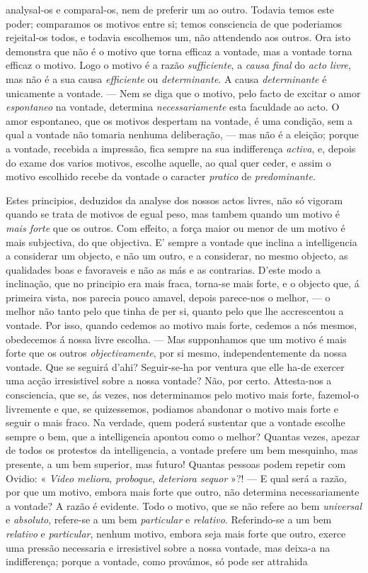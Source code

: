 analysal-os e comparal-os, nem de preferir um ao outro. Todavia temos este poder; comparamos os motivos entre si; temos consciencia de que poderiamos rejeital-os todos, e todavia escolhemos um, não attendendo aos outros. Ora isto demonstra que não é o motivo que torna efficaz a vontade, mas a vontade torna efficaz o motivo. Logo o motivo é a razão \emph{sufficiente}, a \emph{causa final} do \emph{acto livre}, mas não é a sua causa \emph{efficiente} ou \emph{determinante}. A causa \emph{determinante} é unicamente a vontade. --- Nem se diga que o motivo, pelo facto de excitar o amor \emph{espontaneo} na vontade, determina \emph{necessariamente} esta faculdade ao acto. O amor espontaneo, que os motivos despertam na vontade, é uma condição, sem a qual a vontade não tomaria nenhuma deliberação, --- mas não é a eleição; porque a vontade, recebida a impressão, fica sempre na sua indifferença \emph{activa}, e, depois do exame dos varios motivos, escolhe aquelle, ao qual quer ceder, e assim o motivo escolhido recebe da vontade o caracter \emph{pratico} de \emph{predominante}.\par Estes principios, deduzidos da analyse dos nossos actos livres, não só vigoram quando se trata de motivos de egual peso, mas tambem quando um motivo é \emph{mais forte} que os outros. Com effeito, a força maior ou menor de um motivo é mais subjectiva, do que objectiva. E' sempre a vontade que inclina a intelligencia a considerar um objecto, e não um outro, e a considerar, no mesmo objecto, as qualidades boas e favoraveis e não as más e as contrarias. D'este modo a inclinação, que no principio era mais fraca, torna-se mais forte, e o objecto que, á primeira vista, nos parecia pouco amavel, depois parece-nos o melhor, --- o melhor não tanto pelo que tinha de per si, quanto pelo que lhe accrescentou a vontade. Por isso, quando cedemos ao motivo mais forte, cedemos a nós mesmos, obedecemos á nossa livre escolha. --- Mas supponhamos que um motivo é mais forte que os outros \emph{objectivamente}, por si mesmo, independentemente da nossa vontade. Que se seguirá d'ahi? Seguir-se-ha por ventura que elle ha-de exercer uma acção irresistivel sobre a nossa vontade? Não, por certo. Attesta-nos a consciencia, que se, ás vezes, nos determinamos pelo motivo mais forte, fazemol-o livremente e que, se quizessemos, podiamos abandonar o motivo mais forte e seguir o mais fraco. Na verdade, quem poderá sustentar que a vontade escolhe sempre o bem, que a intelligencia apontou como o melhor? Quantas vezes, apezar de todos os protestos da intelligencia, a vontade prefere um bem mesquinho, mas presente, a um bem superior, mas futuro! Quantas pessoas podem repetir com Ovidio: « \emph{Video meliora}, \emph{proboque}, \emph{deteriora sequor} »?! --- E qual será a razão, por que um motivo, embora mais forte que outro, não determina necessariamente a vontade? A razão é evidente. Todo o motivo, que se não refere ao bem \emph{universal} e \emph{absoluto}, refere-se a um bem \emph{particular} e \emph{relativo}. Referindo-se a um bem \emph{relativo} e \emph{particular}, nenhum motivo, embora seja mais forte que outro, exerce uma pressão necessaria e irresistivel sobre a nossa vontade, mas deixa-a na indifferença; porque a vontade, como provámos, só pode ser attrahida 